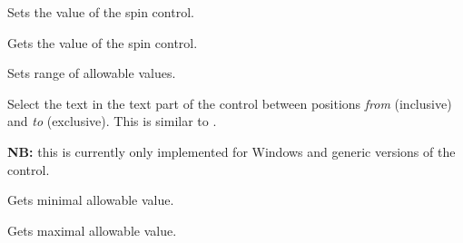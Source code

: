 \label{wxspinctrlsetvalue}



Sets the value of the spin control.

\label{wxspinctrlgetvalue}


Gets the value of the spin control.

\label{wxspinctrlsetrange}


Sets range of allowable values.

\label{wxspinctrlsetselection}


Select the text in the text part of the control between  positions 
{\it from} (inclusive) and {\it to} (exclusive). This is similar to 
.

{\bf NB:} this is currently only implemented for Windows and generic versions
of the control.

\label{wxspinctrlgetmin}


Gets minimal allowable value.

\label{wxspinctrlgetmax}


Gets maximal allowable value.

